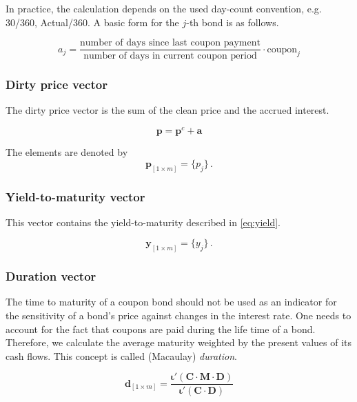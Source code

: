 In practice, the calculation depends on the used day-count convention, e.g. 30/360, Actual/360. A basic form for the $j$-th bond is as follows.

\begin{equation*}
    a_j= \frac{\mbox{number of days since last coupon payment}}{\mbox{number of days in current coupon period}}\cdot \mbox{coupon}_j
\end{equation*}
 	

\subsubsection*{Dirty price vector}

The dirty price vector is the sum of the clean price and the accrued interest.

\begin{displaymath}
\bm{p}=\bm{p}^c+\bm{a}
\end{displaymath}

The elements are denoted by 
\begin{equation*}\label{pd}
    \bm{p}_{\left[1\times m\right]}= \{p_j\}\,.
\end{equation*}


\subsubsection*{Yield-to-maturity vector}

This vector contains the yield-to-maturity described in \eqref{eq:yield}.

\begin{equation*}\label{pd}
    \bm{y}_{\left[1\times m\right]}= \{y_j\}\,.
\end{equation*}



\subsubsection*{Duration vector}

The time to maturity of a coupon bond should not be used as an indicator for the sensitivity of a bond's price against changes in the interest rate. One needs to account for the fact that coupons are paid during the life time of a bond. Therefore, we calculate the average maturity weighted by the present values of its cash flows. This concept is called (Macaulay) \emph{duration}.

\begin{equation*}
  \label{eq:macaulayduration}
  \bm{d}_{\left[1\times m\right]} = \frac{\bm{\iota}'(\bm{C}\cdot\bm{M}\cdot\bm{D})}{\bm{\iota}'(\bm{C}\cdot\bm{D})}
\end{equation*}

